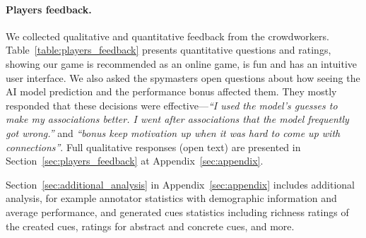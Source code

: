 \documentclass{article}
\begin{document}
\paragraph{Players feedback.}
We collected qualitative and quantitative feedback from the crowdworkers. Table~\ref{table:players_feedback} presents quantitative questions and ratings, showing our game is recommended as an online game, is fun and has an intuitive user interface. We also asked the spymasters open questions about how seeing the AI model prediction and the performance bonus affected them. They mostly responded that these decisions were effective---\textit{``I used the model's guesses to make my associations better. I went after associations that the model frequently got wrong.''} and \textit{``bonus keep motivation up when it was hard to come up with connections''}. Full qualitative responses (open text) are presented in Section~\ref{sec:players_feedback} at Appendix~\ref{sec:appendix}.

Section~\ref{sec:additional_analysis} in Appendix~\ref{sec:appendix} includes additional analysis, for example annotator statistics with demographic information and average performance, and generated cues statistics including richness ratings of the created cues, ratings for abstract and concrete cues, and more.

\begin{table}[!t]
\caption{Players feedback collected from the crowdworkers players (scale of 1-5)}
\label{table:players_feedback}
\end{table}  
 
\end{document}

